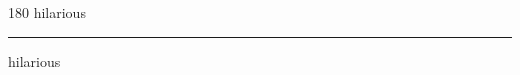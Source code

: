
\begin{frame}
\begin{center}
\begin{turn}{180}
{\fontsize{2.5cm}{1em}\selectfont hilarious}
\end{turn}
\vspace{1em}\par  
\hrule
\vspace{1em}\par  
{\fontsize{2.5cm}{1em}\selectfont hilarious}
\end{center}
\end{frame}

